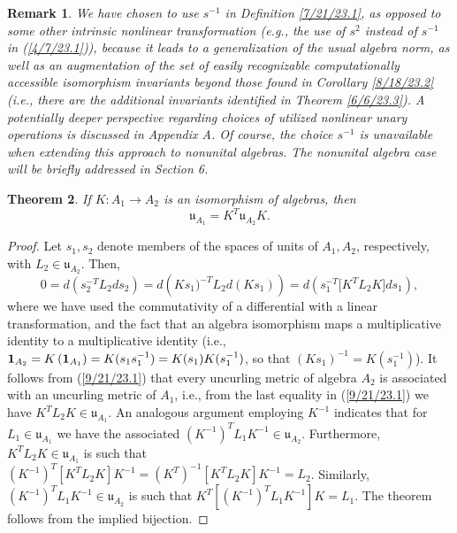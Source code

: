 \documentclass{amsart}
\numberwithin{equation}{section}
\newtheorem{theorem}{Theorem}
\newtheorem{remark}[theorem]{Remark}
\theoremstyle{definition}
\numberwithin{theorem}{section}
\begin{document}
   
\begin{remark}\label{10/16/23.1} {\rm  We have chosen to use $s^{-1}$ in Definition \ref{7/21/23.1}, as opposed to some other intrinsic nonlinear transformation (e.g., the use of $s^2$ instead of $s^{-1}$ in (\ref{4/7/23.1})), because it leads to a generalization of the usual algebra norm, as well as an augmentation of the set of easily recognizable computationally accessible isomorphism invariants beyond those found in Corollary \ref{8/18/23.2} (i.e., there are the additional invariants identified in Theorem \ref{6/6/23.3}).  A potentially deeper perspective regarding choices of utilized nonlinear unary operations is discussed in Appendix A.   Of course, the choice $s^{-1}$ is unavailable when extending this approach to nonunital algebras.  The nonunital algebra case will be briefly addressed in Section 6.} \end{remark}


\begin{theorem} \label{6/6/23.1} If $K:A_1\rightarrow A_2$ is an isomorphism of algebras, then \begin{equation}\label{5/23/23.1} \mathfrak{u}_{A_1} = K^T \mathfrak{u}_{A_2} K. \end{equation} \end{theorem}

\begin{proof} Let $s_1,s_2$ denote members of the spaces of units of $A_1,A_2$, respectively, with $L_2\in \mathfrak{u}_{A_2}$.  Then, \begin{equation} 0 = d\left(s_2^{-T}L_2 ds_2\right) =  d\left(Ks_1)^{-T}L_2 d(Ks_1)\right) =d\left(s_1^{-T} \big[K^T L_2K\big]ds_1\right), \label{9/21/23.1}  \end{equation} where we have used the commutativity of a differential with a linear transformation, and the fact that an algebra isomorphism maps a multiplicative identity to a multiplicative identity (i.e., ${\bf 1}_{A_2} = K\left(\mathbf{1}_{A_1}\right) = K(s_1s_1^{-1}) = K(s_1)K(s_1^{-1})$, so that $(Ks_1)^{-1} = K(s_1^{-1})$).  It follows from (\ref{9/21/23.1}) that every uncurling metric of algebra $A_2$ is associated with an uncurling metric of $A_1$, i.e., from the last equality in (\ref{9/21/23.1}) we have  $K^TL_2K\in\mathfrak{u}_{A_1}$.  An analogous argument employing $K^{-1}$ indicates that for $L_1\in\mathfrak{u}_{A_1}$ we have the associated $(K^{-1})^T L_1 K^{-1} \in \mathfrak{u}_{A_2}$.  Furthermore, $K^T L_2K\in\mathfrak{u}_{A_1}$ is such that $(K^{-1})^T [K^T L_2 K]K^{-1} = (K^T)^{-1} [K^T L_2 K]K^{-1} = L_2$.  Similarly, $(K^{-1})^T L_1K^{-1}\in\mathfrak{u}_{A_2}$ is such that $K^T[(K^{-1})^T L_1K^{-1}] K = L_1$.  The theorem follows from the implied bijection. 
\end{proof}
\end{document}
